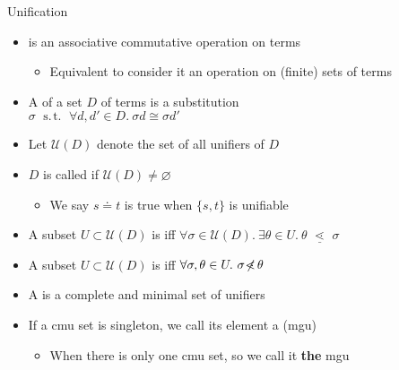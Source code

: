 \documentclass[pdf,fyma2]{prosper} %
\renewcommand{\emptyset}{\varnothing}
\newcommand{\opr}[1]{\ensuremath{\operatorname{#1}}}
\newcommand{\UNIFIERS}{\ensuremath{\mathcal{U}\!}}
\newcommand{\suchthat}{\ensuremath{\opr{~s.\!t.~}}}
\newcommand{\isom}{\ensuremath{\cong}}
\newcommand{\subsume}{\ensuremath{\lessdot}}
\newcommand{\subsumeq}{\ensuremath{\,\,\underline{\!\subsume\!}\,\,}}
\newcommand{\notsubsume}{\ensuremath{\!\not\!\!\subsume\,}}
\renewcommand{\emph}[1]{\textbf{#1}}
\begin{document}
\begin{slide}{Unification}
	\vspace{1em}
	\begin{itemize}
	\item {} is an associative commutative operation on terms
        \begin{itemize}
        \item Equivalent to consider it an operation on (finite) sets of terms
        \end{itemize}
    \item A  of a set $D$ of terms is a substitution
        \\ $\sigma \suchthat \forall d,d'\in D.~ \sigma d \isom \sigma d'$
    \item Let $\UNIFIERS(D)$ denote the set of all unifiers of $D$
    \item $D$ is called  if $\UNIFIERS(D) \neq \emptyset$
        \begin{itemize}
        \item We say $s \doteq t$ is true when $\{s,t\}$ is unifiable
        \end{itemize}
    \item A subset $U \subset \UNIFIERS(D)$ is  iff $\forall \sigma \in \UNIFIERS(D).~ \exists \theta \in U.~ \theta \subsumeq \sigma$
    \item A subset $U \subset \UNIFIERS(D)$ is  iff $\forall \sigma,\theta \in U.~ \sigma \notsubsume \theta$
    \item A  is a complete and minimal set of unifiers
    \item If a cmu set is singleton, we call its element a  (mgu)
        \begin{itemize}
        \item When there is only one cmu set, so we call it \emph{the} mgu
        \end{itemize}
    \end{itemize}
\end{slide}
\end{document}
